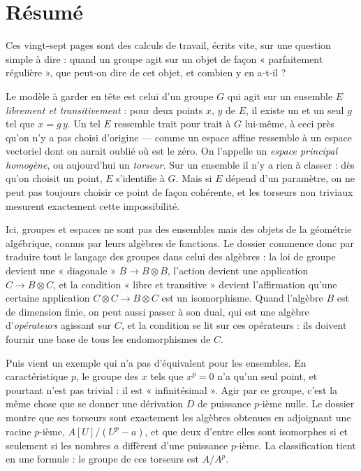 \documentclass[11pt,a4paper]{article}
\begin{document}
\section*{Résumé}

\begin{resume}
Ces vingt-sept pages sont des calculs de travail, écrits vite, sur une
question simple à dire : quand un groupe agit sur un objet de façon
« parfaitement régulière », que peut-on dire de cet objet, et combien y en
a-t-il ?

Le modèle à garder en tête est celui d'un groupe $G$ qui agit sur un ensemble
$E$ \emph{librement et transitivement} : pour deux points $x$, $y$ de $E$, il
existe un et un seul $g$ tel que $x = g\,y$. Un tel $E$ ressemble trait pour
trait à $G$ lui-même, à ceci près qu'on n'y a pas choisi d'origine --- comme
un espace affine ressemble à un espace vectoriel dont on aurait oublié où est
le zéro. On l'appelle un \emph{espace principal homogène}, ou aujourd'hui un
\emph{torseur}. Sur un ensemble il n'y a rien à classer : dès qu'on choisit un
point, $E$ s'identifie à $G$. Mais si $E$ dépend d'un paramètre, on ne peut
pas toujours choisir ce point de façon cohérente, et les torseurs non
triviaux mesurent exactement cette impossibilité.

Ici, groupes et espaces ne sont pas des ensembles mais des objets de la
géométrie algébrique, connus par leurs algèbres de fonctions. Le dossier
commence donc par traduire tout le langage des groupes dans celui des
algèbres : la loi de groupe devient une « diagonale » $B \to B \otimes B$,
l'action devient une application $C \to B \otimes C$, et la condition « libre
et transitive » devient l'affirmation qu'une certaine application
$C \otimes C \to B \otimes C$ est un isomorphisme. Quand l'algèbre $B$ est de
dimension finie, on peut aussi passer à son dual, qui est une algèbre
d'\emph{opérateurs} agissant sur $C$, et la condition se lit sur ces
opérateurs : ils doivent fournir une base de tous les endomorphismes de $C$.

Puis vient un exemple qui n'a pas d'équivalent pour les ensembles. En
caractéristique $p$, le groupe des $x$ tels que $x^p = 0$ n'a qu'un seul
point, et pourtant n'est pas trivial : il est « infinitésimal ». Agir par ce
groupe, c'est la même chose que se donner une dérivation $D$ de puissance
$p$-ième nulle. Le dossier montre que ses torseurs sont exactement les
algèbres obtenues en adjoignant une racine $p$-ième, $A[U]/(U^p - a)$, et que
deux d'entre elles sont isomorphes si et seulement si les nombres $a$
diffèrent d'une puissance $p$-ième. La classification tient en une formule :
le groupe de ces torseurs est $A/A^p$.


\end{resume}
\end{document}
